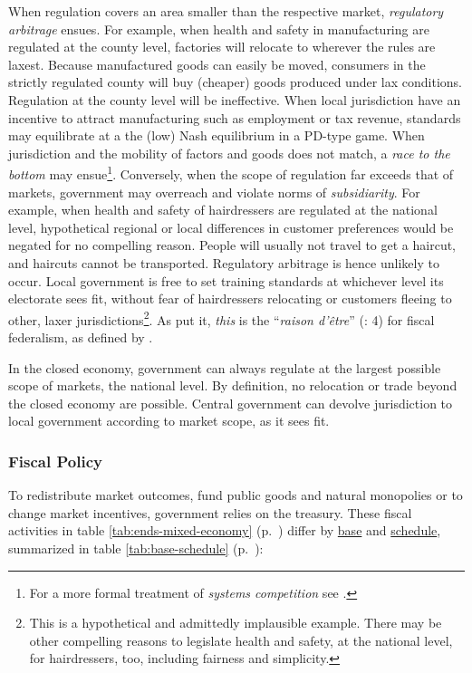 \begin{description}
	When regulation covers an area smaller than the respective market, \emph{regulatory arbitrage} ensues. For example, when health and safety in manufacturing are regulated at the county level, factories will relocate to wherever the rules are laxest. Because manufactured goods can easily be moved, consumers in the strictly regulated county will buy (cheaper) goods produced under lax conditions. Regulation at the county level will be ineffective. When local jurisdiction have an incentive to attract manufacturing such as employment or tax revenue, standards may equilibrate at a the (low) Nash equilibrium in a \gls{PD}-type game. When jurisdiction and the mobility of factors and goods does not match, a \emph{race to the bottom} may ensue\footnote{
		For a more formal treatment of \emph{systems competition} see \cite{Sinn2004}.}. 
	Conversely, when the scope of regulation far exceeds that of markets, government may overreach and violate norms of \emph{subsidiarity}. For example, when health and safety of hairdressers are regulated at the national level, hypothetical regional or local differences in customer preferences would be negated for no compelling reason. People will usually not travel to get a haircut, and haircuts cannot be transported. Regulatory arbitrage is hence unlikely to occur. Local government is free to set training standards at whichever level its electorate sees fit, without fear of hairdressers relocating or customers fleeing to other, laxer jurisdictions\footnote{
		This is a hypothetical and admittedly implausible example. There may be other compelling reasons to legislate health and safety, at the national level, for hairdressers, too, including fairness and simplicity.}.
	As \citeauthor{Bordo2011} put it, \emph{this} is the ``\emph{raison d'\^{e}tre}'' (\citeyear{Bordo2011}: 4) for fiscal federalism, as defined by \cite{Oates1972}.

	In the closed economy, government can always regulate at the largest possible scope of markets, the national level. By definition, no relocation or trade beyond the closed economy are possible. Central government can devolve jurisdiction to local government according to market scope, as it sees fit.

\end{description}

\subsubsection[Fiscal Policy]{Fiscal Policy} \label{sec:fiscal}
To redistribute market outcomes, fund public goods and natural monopolies or to change market incentives, government relies on the treasury. These fiscal activities in table \ref{tab:ends-mixed-economy} (p.~\pageref{tab:ends-mixed-economy}) differ by \hyperref[it:base]{base} and \hyperref[it:schedule]{schedule}, summarized in table \ref{tab:base-schedule} (p.~\pageref{tab:base-schedule}):

